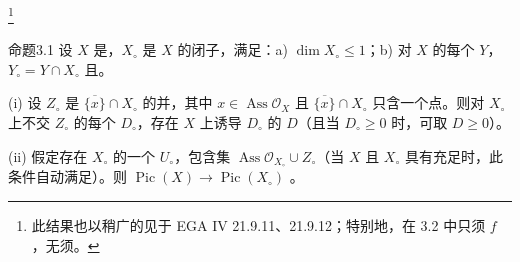 \footnote{此结果也以稍广的见于 EGA IV 21.9.11、21.9.12；特别地，在 3.2 中只须 $f$ ，无须。}
\begin{SGAresult}{命题}{3.1}
设 $X$ 是，$X_\circ$ 是 $X$ 的闭子，满足：a) $\dim X_\circ\leq1$；b) 对 $X$ 的每个 $Y$，$Y_\circ=Y\cap X_\circ$ 且。

(i) 设 $Z_\circ$ 是 $\overline{\{x\}}\cap X_\circ$ 的并，其中 $x\in\operatorname{Ass}\mathcal O_X$ 且 $\overline{\{x\}}\cap X_\circ$ 只含一个点。则对 $X_\circ$ 上不交 $Z_\circ$ 的每个 $D_\circ$，存在 $X$ 上诱导 $D_\circ$ 的 $D$（且当 $D_\circ\geq0$ 时，可取 $D\geq0$）。

(ii) 假定存在 $X_\circ$ 的一个 $U_\circ$，包含集 $\operatorname{Ass}\mathcal O_{X_\circ}\cup Z_\circ$（当 $X$ 且 $X_\circ$ 具有充足时，此条件自动满足）。则 $\operatorname{Pic}(X)\to\operatorname{Pic}(X_\circ)$ 。
\end{SGAresult}
